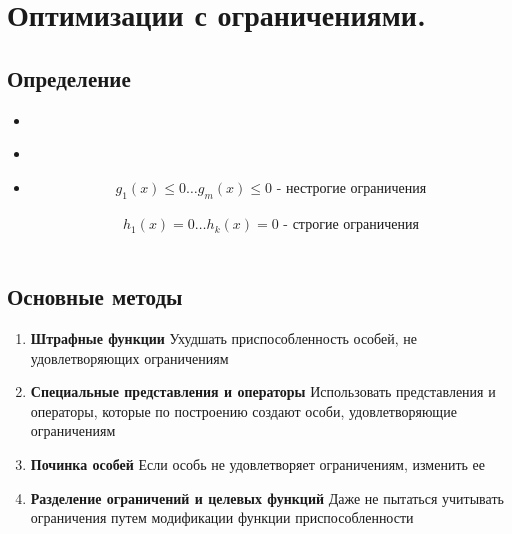 \usepackage{amsmath}
\usepackage{lh}


\section{Оптимизации с ограничениями.}

\subsection{Определение}
\begin{itemize}
    \item {} \\
    \item {} \\
    \item {}
    \subitem \[g_{1}(x) \leq 0 \dots g_{m}(x) \leq 0 \text{ -  нестрогие ограничения} \] \\
    \subitem \[h_{1}(x) = 0 \dots h_{k}(x) = 0 \text{ - строгие ограничения} \] \\
\end{itemize}

\subsection{Основные методы}

\begin{enumerate}
    \item \textbf{Штрафные функции}
    \subitem Ухудшать приспособленность особей, не удовлетворяющих ограничениям
    \item \textbf{Специальные представления и операторы}
    \subitem  Использовать представления и операторы, которые по построению создают особи, удовлетворяющие ограничениям
    \item \textbf{Починка особей}
    \subitem  Если особь не удовлетворяет ограничениям, изменить ее
    \item \textbf{Разделение ограничений и целевых функций}
    \subitem Даже не пытаться учитывать ограничения путем модификации функции приспособленности
\end{enumerate}



